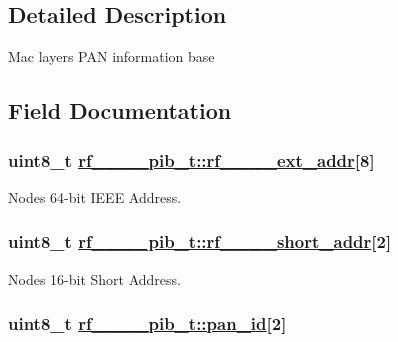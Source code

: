 \subsection{Detailed Description}
Mac layers PAN information base 



\subsection{Field Documentation}
\hypertarget{structrf__802__15__4__pib__t_ada75ac4d0156c4b98bafee8b33447d6}{
\subsubsection[rf\_\-802\_\-15\_\-4\_\-ext\_\-addr]{\setlength{\rightskip}{0pt plus 5cm}uint8\_\-t \hyperlink{structrf__802__15__4__pib__t_ada75ac4d0156c4b98bafee8b33447d6}{rf\_\_\_\_\-pib\_\-t::rf\_\_\_\_\-ext\_\-addr}\mbox{[}8\mbox{]}}}
\label{structrf__802__15__4__pib__t_ada75ac4d0156c4b98bafee8b33447d6}


Nodes 64-bit IEEE Address. \hypertarget{structrf__802__15__4__pib__t_14fd95a363f5d5c7a2c9e0a55fa73c92}{
\subsubsection[rf\_\-802\_\-15\_\-4\_\-short\_\-addr]{\setlength{\rightskip}{0pt plus 5cm}uint8\_\-t \hyperlink{structrf__802__15__4__pib__t_14fd95a363f5d5c7a2c9e0a55fa73c92}{rf\_\_\_\_\-pib\_\-t::rf\_\_\_\_\-short\_\-addr}\mbox{[}2\mbox{]}}}
\label{structrf__802__15__4__pib__t_14fd95a363f5d5c7a2c9e0a55fa73c92}


Nodes 16-bit Short Address. \hypertarget{structrf__802__15__4__pib__t_a3a25fd64e439278076803b8649074c1}{
\subsubsection[pan\_\-id]{\setlength{\rightskip}{0pt plus 5cm}uint8\_\-t \hyperlink{structrf__802__15__4__pib__t_a3a25fd64e439278076803b8649074c1}{rf\_\_\_\_\-pib\_\-t::pan\_\-id}\mbox{[}2\mbox{]}}}
\label{structrf__802__15__4__pib__t_a3a25fd64e439278076803b8649074c1}


